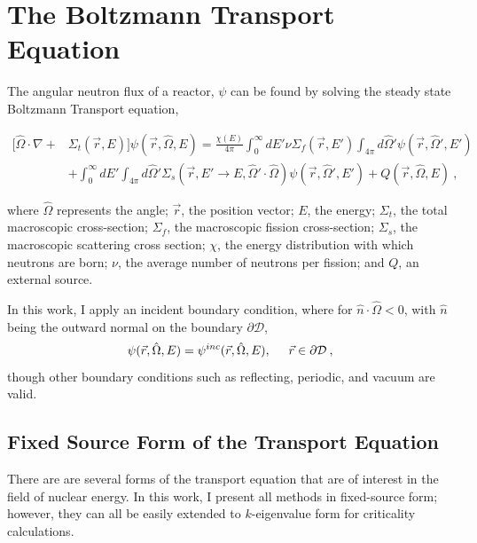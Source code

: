 \section{The Boltzmann Transport Equation}
The angular neutron flux of a reactor, $\psi$ can be found by solving the steady state Boltzmann Transport equation,

\begin{equation}
\begin{split}
  [\hat{\Omega} \cdot \nabla + &\Sigma_t(\vec{r}, E)]\psi(\vec{r}, \hat{\Omega}, E) = \frac{\chi(E)}{4\pi} \int_0^\infty dE' \nu \Sigma_{f}(\vec{r}, E') \int_{4\pi} d\hat{\Omega}'\psi(\vec{r}, \hat{\Omega}', E') \\   &+ \int_0^\infty dE' \int_{4\pi} d\hat{\Omega}' \Sigma_s(\vec{r}, E' \rightarrow E, \hat{\Omega}' \cdot \hat{\Omega})\psi(\vec{r}, \hat{\Omega}', E') + Q(\vec{r}, \hat{\Omega}, E)   \:,
\end{split}
\label{eq:transport}
\end{equation}

where $\hat{\Omega}$ represents the angle; $\vec{r}$, the position vector; $E$, the energy; $\Sigma_t$, the total macroscopic cross-section; $\Sigma_f$, the macroscopic fission cross-section; $\Sigma_s$, the macroscopic scattering cross section; $\chi$, the energy distribution with which neutrons are born; $\nu$, the average number of neutrons per fission; and $Q$, an external source.  


In this work, I apply an incident boundary condition, where for $\hat{n} \cdot \hat{\Omega} < 0$, with $\hat{n}$ being the outward normal on the boundary $\partial \mathcal{D}$,
\begin{equation}
    \psi(\vec{r}, \hat{\Omega}, E) = \psi^{inc}(\vec{r}, \hat{\Omega}, E), \hspace{5mm} \vec{r} \in \partial \mathcal{D}\:,
\end{equation}
though other boundary conditions such as reflecting, periodic, and vacuum are valid.

\subsection{Fixed Source Form of the Transport Equation}
There are are several forms of the transport equation that are of interest in the field of nuclear energy. In this work, I present all methods in fixed-source form; however, they can all be easily extended to $k$-eigenvalue form for criticality calculations. 

